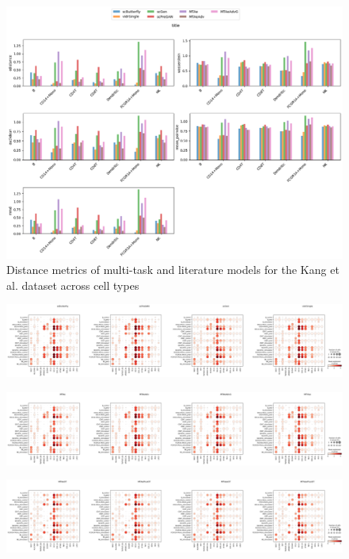 \documentclass[12pt, a4paper]{article}
\begin{document}
\begin{figure}[h!]
    \centering
    \includegraphics[width=.85\textwidth]{selected_benchmarking_cell_type_distance_metrics_pbmc.png}
    \caption{Distance metrics of multi-task and literature models for the Kang et al. \cite{kanaGenerativeModelingSinglecell2023} dataset across cell types}
    \label{fig:selected_pbmc_distance}
\end{figure}

\begin{figure}[h!]
    \centering
    \includegraphics[width=.85\textwidth]{dotplots_literature_pbmc.png}
    \caption{}
    \label{fig:selected_pbmc_distance}
\end{figure}

\begin{figure}[h!]
    \centering
    \includegraphics[width=.85\textwidth]{dotplots_multitask1_pbmc.png}
    \caption{}
    \label{fig:selected_pbmc_distance}
\end{figure}

\begin{figure}[h!]
    \centering
    \includegraphics[width=.85\textwidth]{dotplots_multitask2_pbmc.png}
    \caption{}
    \label{fig:selected_pbmc_distance}
\end{figure}
\end{document}
